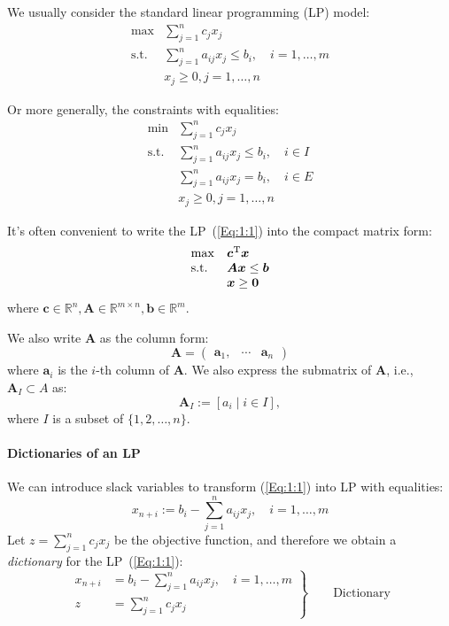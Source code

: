 We usually consider the standard linear programming (LP) model:
\begin{equation}\label{Eq:1:1}
\begin{array}{ll}
\max&\sum_{j=1}^nc_jx_j\\
\text{s.t.}&\sum_{j=1}^na_{ij}x_j\le b_i,\quad i=1,\dots,m\\
&x_j\ge 0, j=1,\dots,n
\end{array}
\end{equation}

Or more generally, the constraints with equalities:
\begin{equation*}
\begin{array}{ll}
\min&\sum_{j=1}^nc_jx_j\\
\text{s.t.}&\sum_{j=1}^na_{ij}x_j\le b_i,\quad i\in I\\
&\sum_{j=1}^na_{ij}x_j= b_i,\quad i\in E\\
&x_j\ge 0, j=1,\dots,n
\end{array}
\end{equation*}

It's often convenient to write the LP~(\ref{Eq:1:1}) into the compact matrix form:
\begin{equation}\label{Eq:1:2}
\begin{array}{ll}
\max&\bm c^{\mathrm T}\bm x\\
\text{s.t.}&\bm{Ax}\le\bm b\\
&\bm x\ge\bm0
\end{array}
\end{equation}
where $\bm c\in\mathbb{R}^n,\bm A\in\mathbb{R}^{m\times n},\bm b\in\mathbb{R}^m$.

We also write $\bm A$ as the column form:
\[
\bm A=\begin{pmatrix}
\bm a_1,&\cdots&\bm a_n
\end{pmatrix}
\]
where $\bm a_i$ is the $i$-th column of $\bm A$. We also express the submatrix of $\bm A$, i.e., $\bm A_I\subset A$ as:
\[
\bm A_I:=[a_i\mid i\in I],
\]
where $I$ is a subset of $\{1,2,\dots,n\}$.

\paragraph{Dictionaries of an LP}
We can introduce slack variables to transform (\ref{Eq:1:1}) into LP with equalities:
\[
x_{n+i}:=b_i - \sum_{j=1}^na_{ij}x_j,\quad i=1,\dots,m
\]
Let $z=\sum_{j=1}^nc_jx_j$ be the objective function, and therefore we obtain a \emph{dictionary} for the LP~(\ref{Eq:1:1}):
\begin{equation}
\left.
\begin{aligned}
x_{n+i}&=b_i - \sum_{j=1}^na_{ij}x_j,\quad i=1,\dots,m\\
z&=\sum_{j=1}^nc_jx_j
\end{aligned}
\right\}\qquad \text{Dictionary}
\end{equation}

